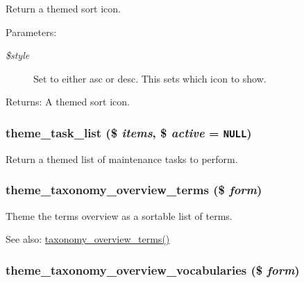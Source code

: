 Return a themed sort icon.

\begin{Desc}
\item[Parameters:]
\begin{description}
\item[{\em \$style}]Set to either asc or desc. This sets which icon to show. \end{description}
\end{Desc}
\begin{Desc}
\item[Returns:]A themed sort icon. \end{Desc}
\hypertarget{group__themeable_g83bdead8c42251faaf93ddc2480b9d7f}{
\subsubsection[{theme\_\-task\_\-list}]{\setlength{\rightskip}{0pt plus 5cm}theme\_\-task\_\-list (\$ {\em items}, \/  \$ {\em active} = {\tt NULL})}}
\label{group__themeable_g83bdead8c42251faaf93ddc2480b9d7f}


Return a themed list of maintenance tasks to perform. \hypertarget{group__themeable_ga6eed299548007f120519d1e353b811f}{
\subsubsection[{theme\_\-taxonomy\_\-overview\_\-terms}]{\setlength{\rightskip}{0pt plus 5cm}theme\_\-taxonomy\_\-overview\_\-terms (\$ {\em form})}}
\label{group__themeable_ga6eed299548007f120519d1e353b811f}


Theme the terms overview as a sortable list of terms.

\begin{Desc}
\item[See also:]\hyperlink{group__forms_g27f78faeeac394ba8359e22501c5b333}{taxonomy\_\-overview\_\-terms()} \end{Desc}
\hypertarget{group__themeable_gc13e7fb950bcb43c38a2bf373d5ea348}{
\subsubsection[{theme\_\-taxonomy\_\-overview\_\-vocabularies}]{\setlength{\rightskip}{0pt plus 5cm}theme\_\-taxonomy\_\-overview\_\-vocabularies (\$ {\em form})}}
\label{group__themeable_gc13e7fb950bcb43c38a2bf373d5ea348}


